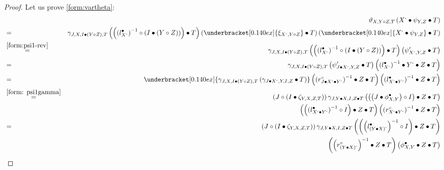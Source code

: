 \documentclass[nosumlimits,twoside]{amsart}
\theoremstyle{definition}
\theoremstyle{remark}
\def\revsn{\text{-}}
\begin{document}
\begin{proof}
Let us prove \eqref{form:vartheta}:
\begin{eqnarray*}
&&\vartheta _{X,Y\circ Z,T}\left( X^{\revsn }\bullet \psi _{Y,Z}\bullet
T\right)  \\
&=&\gamma _{J,X,I\bullet \left( Y\circ Z\right) ,T}\left( \left( \left(
l_{X^{\revsn }}^{\bullet }\right) ^{-1}\circ \left( I\bullet \left( Y\circ
Z\right) \right) \right) \bullet T\right) \left( \underbracket[0.140ex]{\xi _{X^{\revsn
},Y\circ Z}}\bullet T\right) \left( \underbracket[0.140ex]{X^{\revsn }\bullet \psi _{Y,Z}}%
\bullet T\right)  \\
&\overset{\eqref{form:psi1-rev} }{=}&\gamma _{J,X,I\bullet
\left( Y\circ Z\right) ,T}\left( \left( \left( l_{X^{\revsn }}^{\bullet
}\right) ^{-1}\circ \left( I\bullet \left( Y\circ Z\right) \right) \right)
\bullet T\right) \left( \psi _{X^{\revsn },Y,Z}^{\prime }\bullet T\right)  \\
&=&\gamma _{J,X,I\bullet \left( Y\circ Z\right) ,T}\left( \psi _{J\bullet
X^{\revsn },Y,Z}^{\prime }\bullet T\right) \left( \left( l_{X^{\revsn
}}^{\bullet }\right) ^{-1}\bullet Y^{\revsn }\bullet Z\bullet T\right) \\
&=&\underbracket[0.140ex]{\gamma _{J,X,I\bullet \left( Y\circ Z\right) ,T}\left( \gamma
_{J\bullet X^{\revsn },Y,I,Z}\bullet T\right) }\left( \left( r_{J\bullet
X^{\revsn }\bullet Y^{\revsn }}^{\circ }\right) ^{-1}\bullet Z\bullet T\right)
\left( \left( l_{X^{\revsn }\bullet Y^{\revsn }}^{\bullet }\right) ^{-1}\bullet
Z\bullet T\right)  \\
&\overset{\eqref{form: psi1gamma}}{=}&\left( J\circ \left( I\bullet \zeta
_{Y,X,Z,T}\right) \right) \gamma _{J,Y\bullet X,I,Z\bullet T}\left( \left(
\left( J\bullet \phi _{X,Y}^{\bullet }\right) \circ I\right) \bullet
Z\bullet T\right)\\
&&\left( \left( \left( l_{X^{\revsn }\bullet Y^{\revsn
}}^{\bullet }\right) ^{-1}\circ I\right) \bullet Z\bullet T\right) \left(
\left( r_{X^{\revsn }\bullet Y^{\revsn }}^{\circ }\right) ^{-1}\bullet Z\bullet
T\right)  \\
&=&\left( J\circ \left( I\bullet \zeta _{Y,X,Z,T}\right) \right) \gamma
_{J,Y\bullet X,I,Z\bullet T}\left( \left( \left( l_{\left( Y\bullet X\right)
^{\revsn }}^{\bullet }\right) ^{-1}\circ I\right) \bullet Z\bullet T\right)\\
&&
\left( \left( r_{\left( Y\bullet X\right) ^{\revsn }}^{\circ }\right)
^{-1}\bullet Z\bullet T\right) \left( \phi _{X,Y}^{\bullet }\bullet Z\bullet
T\right)  \\

\end{eqnarray*}
\end{proof}
\end{document}

